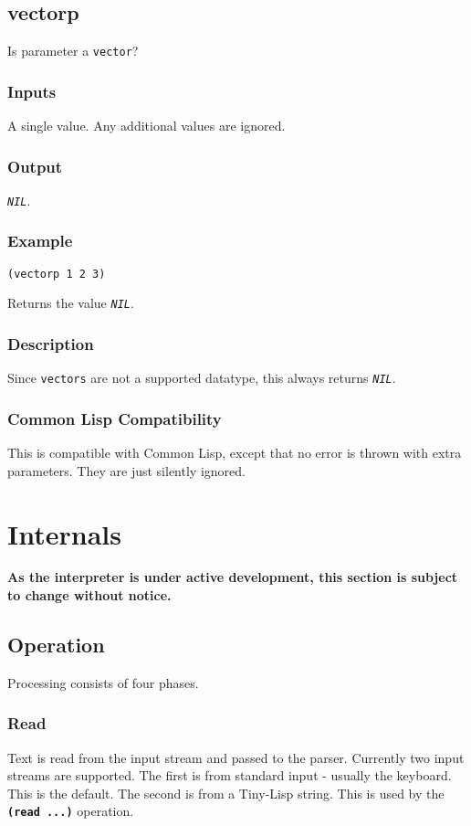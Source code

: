 \documentclass[10pt, openany]{book}
\newcommand{\operation}[1]{\textbf{\texttt{#1}}}
\newcommand{\constant}[1]{\emph{\texttt{#1}}}
\newcommand{\datatype}[1]{\texttt{#1}}
\newcommand{\tl}{Tiny-Lisp}
\newcommand{\cl}{Common Lisp}
\begin{document}
\section{vectorp}
Is parameter a \datatype{vector}?
\subsection{Inputs}
A single value.  Any additional values are ignored.
\subsection{Output}
\constant{NIL}.
\subsection{Example}
\begin{lstlisting}
(vectorp 1 2 3)
\end{lstlisting}
Returns the value \constant{NIL}.
\subsection{Description}
Since \datatype{vectors} are not a supported datatype, this always returns \constant{NIL}.
\subsection{Common Lisp Compatibility}
This is compatible with \cl, except that no error is thrown with extra parameters.  They are just silently ignored.
\chapter{Internals}
\textbf{As the interpreter is under active development, this section is subject to change without notice.}

\section{Operation}
Processing consists of four phases.

\subsection{Read}
Text is read from the input stream and passed to the parser.  Currently two input streams are supported.  The first is from standard input - usually the keyboard.  This is the default.  The second is from a \tl{} string.  This is used by the \operation{(read ...)} operation.
\end{document}
